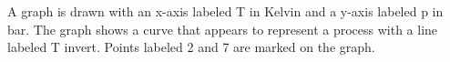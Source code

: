 A graph is drawn with an x-axis labeled T in Kelvin and a y-axis labeled p in bar. The graph shows a curve that appears to represent a process with a line labeled T invert. Points labeled 2 and 7 are marked on the graph.